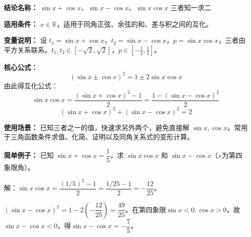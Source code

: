 \textbf{结论名称：} $\sin x+\cos x$、$\sin x-\cos x$、$\sin x\cos x$ 三者知一求二

\textbf{适用条件：} $x\in\mathbb{R}$，适用于同角正弦、余弦的和、差与积之间的互化。

\textbf{变量说明：} 设 $t_1=\sin x+\cos x$，$t_2=\sin x-\cos x$，$p=\sin x\cos x$，三者由平方关系联系。$t_1,t_2\in[-\sqrt2,\sqrt2]$，$p\in[-\tfrac12,\tfrac12]$。

\textbf{核心公式：}
\[
\boxed{(\sin x\pm\cos x)^2=1\pm 2\sin x\cos x}
\]
由此得互化公式：
\[
\sin x\cos x = \frac{(\sin x+\cos x)^2-1}{2} = \frac{1-(\sin x-\cos x)^2}{2}
\]
\[
(\sin x+\cos x)^2 + (\sin x-\cos x)^2 = 2
\]

\textbf{使用场景：} 已知三者之一的值，快速求另外两个，避免直接解 $\sin x,\cos x$。常用于三角函数条件求值、化简、证明以及同角关系式的变形计算。

\textbf{简单例子：} 已知 $\sin x+\cos x=\dfrac{1}{5}$，求 $\sin x\cos x$ 和 $\sin x-\cos x$（$x$为第四象限角）。
\vspace{0.5em}

解：$\sin x\cos x = \dfrac{(1/5)^2-1}{2} = \dfrac{1/25-1}{2} = -\dfrac{12}{25}$。
\vspace{0.5em}

$(\sin x-\cos x)^2 = 1 - 2\left(-\dfrac{12}{25}\right) = \dfrac{49}{25}$。在第四象限$\sin x<0,\cos x>0$，故$\sin x-\cos x<0$，得$\sin x-\cos x = -\dfrac{7}{5}$。